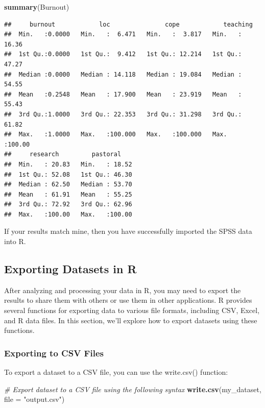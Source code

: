 \documentclass[
]{book}
\newenvironment{Shaded}{\begin{snugshade}}{\end{snugshade}}
\newcommand{\AttributeTok}[1]{\textcolor[rgb]{0.13,0.29,0.53}{#1}}
\newcommand{\CommentTok}[1]{\textcolor[rgb]{0.56,0.35,0.01}{\textit{#1}}}
\newcommand{\FunctionTok}[1]{\textcolor[rgb]{0.13,0.29,0.53}{\textbf{#1}}}
\newcommand{\NormalTok}[1]{#1}
\newcommand{\StringTok}[1]{\textcolor[rgb]{0.31,0.60,0.02}{#1}}
\begin{document}
\begin{Shaded}
\begin{Highlighting}[]
\FunctionTok{summary}\NormalTok{(Burnout)}
\end{Highlighting}
\end{Shaded}

\begin{verbatim}
##     burnout            loc               cope            teaching     
##  Min.   :0.0000   Min.   :  6.471   Min.   :  3.817   Min.   : 16.36  
##  1st Qu.:0.0000   1st Qu.:  9.412   1st Qu.: 12.214   1st Qu.: 47.27  
##  Median :0.0000   Median : 14.118   Median : 19.084   Median : 54.55  
##  Mean   :0.2548   Mean   : 17.900   Mean   : 23.919   Mean   : 55.43  
##  3rd Qu.:1.0000   3rd Qu.: 22.353   3rd Qu.: 31.298   3rd Qu.: 61.82  
##  Max.   :1.0000   Max.   :100.000   Max.   :100.000   Max.   :100.00  
##     research         pastoral     
##  Min.   : 20.83   Min.   : 18.52  
##  1st Qu.: 52.08   1st Qu.: 46.30  
##  Median : 62.50   Median : 53.70  
##  Mean   : 61.91   Mean   : 55.25  
##  3rd Qu.: 72.92   3rd Qu.: 62.96  
##  Max.   :100.00   Max.   :100.00
\end{verbatim}

If your results match mine, then you have successfully imported the SPSS data into R.

\hypertarget{exporting-datasets-in-r}{%
\subsection{Exporting Datasets in R}\label{exporting-datasets-in-r}}

After analyzing and processing your data in R, you may need to export the results to share them with others or use them in other applications. R provides several functions for exporting data to various file formats, including CSV, Excel, and R data files. In this section, we'll explore how to export datasets using these functions.

\hypertarget{exporting-to-csv-files}{%
\subsubsection{Exporting to CSV Files}\label{exporting-to-csv-files}}

To export a dataset to a CSV file, you can use the write.csv() function:

\begin{Shaded}
\begin{Highlighting}[]
\CommentTok{\# Export dataset to a CSV file using the following syntax}
\FunctionTok{write.csv}\NormalTok{(my\_dataset, }\AttributeTok{file =} \StringTok{"output.csv"}\NormalTok{)}
\end{Highlighting}
\end{Shaded}
\end{document}
